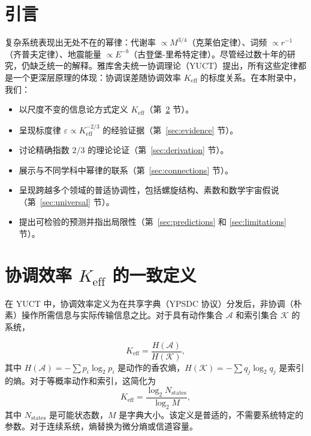 \documentclass[12pt]{article}
\newcommand{\Keff}{K_{\mathrm{eff}}}
\newcommand{\eps}{\varepsilon}
\begin{document}
	\tableofcontents
	\newpage
	
	\section{引言}
	复杂系统表现出无处不在的幂律：代谢率 \(\propto M^{3/4}\)（克莱伯定律）、词频 \(\propto r^{-1}\)（齐普夫定律）、地震能量 \(\propto E^{-b}\)（古登堡-里希特定律）。尽管经过数十年的研究，仍缺乏统一的解释。雅库舍夫统一协调理论（YUCT）提出，所有这些定律都是一个更深层原理的体现：协调误差随协调效率 \(\Keff\) 的标度关系。在本附录中，我们：
	\begin{itemize}
		\item 以尺度不变的信息论方式定义 \(\Keff\)（第~\ref{sec:keff} 节）。
		\item 呈现标度律 \(\eps \propto \Keff^{-2/3}\) 的经验证据（第~\ref{sec:evidence} 节）。
		\item 讨论精确指数 \(2/3\) 的理论论证（第~\ref{sec:derivation} 节）。
		\item 展示与不同学科中幂律的联系（第~\ref{sec:connections} 节）。
		\item 呈现跨越多个领域的普适协调性，包括螺旋结构、素数和数学宇宙假说（第~\ref{sec:universal} 节）。
		\item 提出可检验的预测并指出局限性（第~\ref{sec:predictions} 和 \ref{sec:limitations} 节）。
	\end{itemize}
	
	\section{协调效率 \(\Keff\) 的一致定义}
	\label{sec:keff}
	
	在 YUCT 中，协调效率定义为在共享字典（YPSDC 协议）分发后，非协调（朴素）操作所需信息与实际传输信息之比。对于具有动作集合 \(\mathcal{A}\) 和索引集合 \(\mathcal{K}\) 的系统，
	
	\begin{equation}
		\Keff = \frac{H(\mathcal{A})}{H(\mathcal{K})},
		\label{eq:keff}
	\end{equation}
	其中 \(H(\mathcal{A}) = -\sum p_i \log_2 p_i\) 是动作的香农熵，\(H(\mathcal{K}) = -\sum q_j \log_2 q_j\) 是索引的熵。对于等概率动作和索引，这简化为
	\begin{equation}
		\Keff = \frac{\log_2 N_{\text{states}}}{\log_2 M},
		\label{eq:keff-simple}
	\end{equation}
	其中 \(N_{\text{states}}\) 是可能状态数，\(M\) 是字典大小。该定义是普适的，不需要系统特定的参数。对于连续系统，熵替换为微分熵或信道容量。
	
\end{document}
